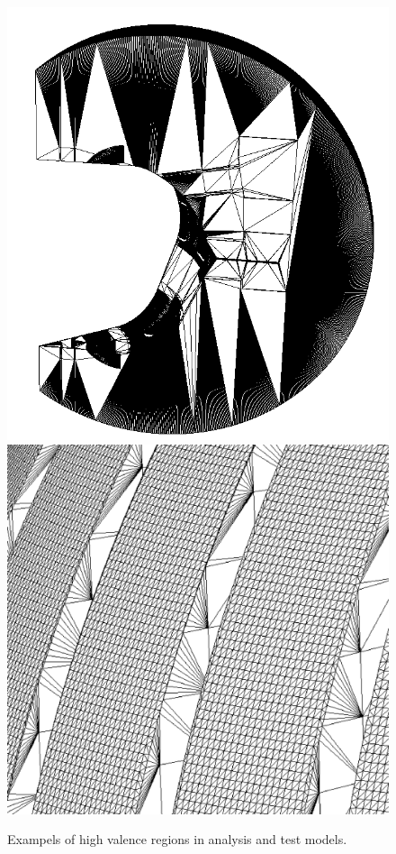 \documentclass[12pt, a4paper]{article}
\begin{document}
\begin{figure}[H]
  \centering
    \includegraphics[scale=0.2]{iter_sideon.png}
    \includegraphics[scale=0.1]{ds_hv.png}
    \caption{Exampels of high valence regions in analysis and test models.}
    \label{hv_examples}
\end{figure}
\end{document}
